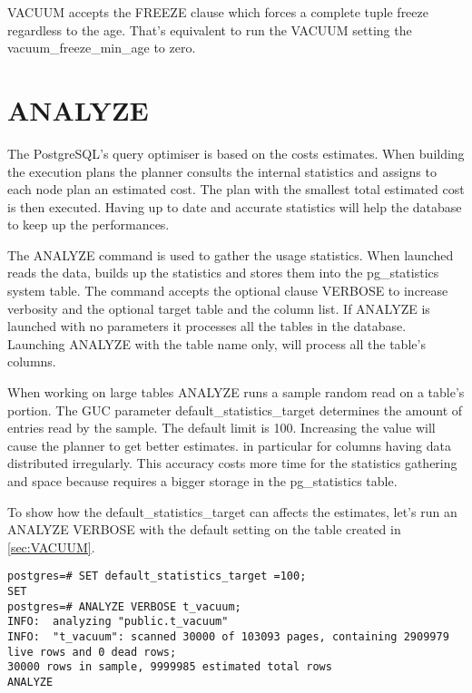 VACUUM accepts the FREEZE  clause which forces a complete tuple freeze 
regardless to the age. That's equivalent to run the VACUUM setting the vacuum\_freeze\_min\_age to 
zero.


\section{ANALYZE}
\label{sec:ANALYZE}
The PostgreSQL's query optimiser is based on the costs estimates. When building the execution plans 
the planner consults the internal statistics and assigns to each node plan an estimated cost. The 
plan with the smallest total estimated cost is then executed. Having up to date and 
accurate statistics will help the database to keep up the performances.\newline

The ANALYZE command is used to gather the usage statistics. When launched reads the 
data, builds up the statistics and stores them into the pg\_statistics system table. The command accepts the optional clause VERBOSE to increase verbosity and the 
optional target table and the column list. If ANALYZE is launched with no parameters it 
processes all the tables in the database. Launching ANALYZE with the table name only, will process 
all the table's columns.\newline

When working on large tables ANALYZE runs a sample random read on a table's portion.  The GUC 
parameter default\_statistics\_target determines the amount of entries read by the sample. The 
default limit is 100. Increasing the value will cause the planner to get better estimates. in 
particular for columns having data distributed irregularly. This accuracy costs more time for the 
statistics gathering and space because requires a bigger storage in the pg\_statistics 
table.\newline


To show how the default\_statistics\_target can affects the estimates, let's run an ANALYZE VERBOSE 
with the default setting on the table created in \ref{sec:VACUUM}.

\begin{lstlisting}[style=pgsql]
postgres=# SET default_statistics_target =100;
SET
postgres=# ANALYZE VERBOSE t_vacuum;
INFO:  analyzing "public.t_vacuum"
INFO:  "t_vacuum": scanned 30000 of 103093 pages, containing 2909979 live rows and 0 dead rows; 
30000 rows in sample, 9999985 estimated total rows
ANALYZE
\end{lstlisting}

